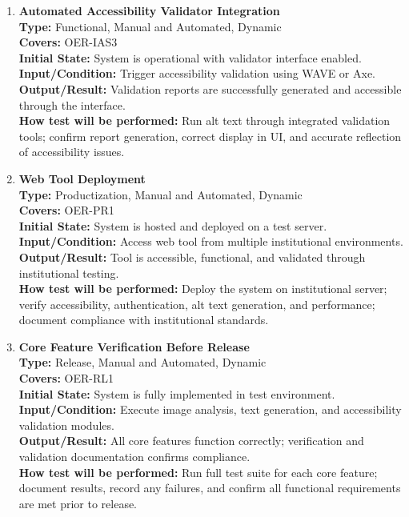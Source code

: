 \documentclass[12pt, titlepage]{article}
\begin{document}
\begin{enumerate}[label=NFR-ST \arabic*., wide=0pt, leftmargin=*]
  \item \textbf{Automated Accessibility Validator Integration} \\[2mm]
    \textbf{Type:} Functional, Manual and Automated, Dynamic \\
    \textbf{Covers:} OER-IAS3 \\
    \textbf{Initial State:} System is operational with validator
    interface enabled. \\
    \textbf{Input/Condition:} Trigger accessibility validation using
    WAVE or Axe. \\
    \textbf{Output/Result:} Validation reports are successfully
    generated and accessible through the interface. \\[2mm]
    \textbf{How test will be performed:}
    Run alt text through integrated validation tools; confirm report
    generation, correct display in UI, and accurate reflection of
    accessibility issues.

  \item \textbf{Web Tool Deployment} \\[2mm]
    \textbf{Type:} Productization, Manual and Automated, Dynamic \\
    \textbf{Covers:} OER-PR1 \\
    \textbf{Initial State:} System is hosted and deployed on a test server. \\
    \textbf{Input/Condition:} Access web tool from multiple
    institutional environments. \\
    \textbf{Output/Result:} Tool is accessible, functional, and
    validated through institutional testing. \\[2mm]
    \textbf{How test will be performed:}
    Deploy the system on institutional server; verify accessibility,
    authentication, alt text generation, and performance; document
    compliance with institutional standards.

  \item \textbf{Core Feature Verification Before Release} \\[2mm]
    \textbf{Type:} Release, Manual and Automated, Dynamic \\
    \textbf{Covers:} OER-RL1 \\
    \textbf{Initial State:} System is fully implemented in test environment. \\
    \textbf{Input/Condition:} Execute image analysis, text
    generation, and accessibility validation modules. \\
    \textbf{Output/Result:} All core features function correctly;
    verification and validation documentation confirms compliance. \\[2mm]
    \textbf{How test will be performed:}
    Run full test suite for each core feature; document results,
    record any failures, and confirm all functional requirements are
    met prior to release.


\end{enumerate}
\end{document}
